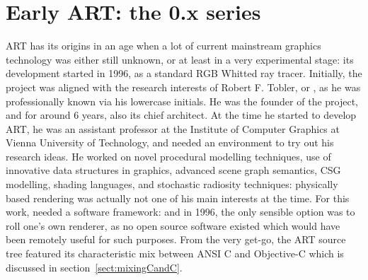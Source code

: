 \section{Early ART: the 0.x series}

ART has its origins in an age when a lot of current mainstream graphics technology was either still unknown, or at least  in a very experimental stage: its development started in 1996, as a standard RGB Whitted ray tracer. Initially, the project was aligned with the research interests of Robert F. Tobler, or , as he was professionally known via his lowercase initials. He was the founder of the project, and for around 6 years, also its chief architect. At the time he started to develop ART, he was an assistant professor at the Institute of Computer Graphics at Vienna University of Technology, and needed an environment to try out his research ideas. He worked on novel procedural modelling techniques, use of innovative data structures in graphics, advanced scene graph semantics, CSG modelling, shading languages, and stochastic radiosity techniques: physically based rendering was actually not one of his main interests at the time. For this work,  needed a software framework: and in 1996, the only sensible option was to roll one's own renderer, as no open source software existed which would have been remotely useful for such purposes. From the very get-go, the ART source tree featured its characteristic mix between ANSI C and Objective-C which is discussed in section~\ref{sect:mixingCandC}.

